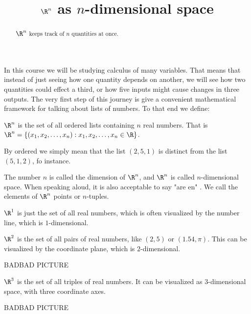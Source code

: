 \documentclass{ximera}
\begin{document}
\title{$\R^n$ as $n$-dimensional space}
\begin{abstract}
	$\R^n$ keeps track of $n$ quantities at once.
\end{abstract}
In this course we will be studying calculus of many variables.  That means that instead of just seeing how one quantity depends on another, we will see
how two quantities could effect a third, or how five inputs might cause changes in three outputs.  The very first step of this journey is give a convenient mathematical 
framework for talking about lists of numbers.  To that end we define:

\begin{definition}
  $\R^n$ is the set of all ordered lists containing $n$ real numbers.  That is $\R^n = \{ (x_1,x_2,\dots, x_n) : x_1,x_2,\dots, x_n \in \R \}$.
\end{definition}

By ordered we simply mean that the list $(2,5,1)$ is distinct from the list $(5,1,2)$, fo instance.

The number $n$ is called the dimension of $\R^n$, and $\R^n$ is called $n$-dimensional space.  When speaking aloud, it is also acceptable to say "are en" .
 We call the elements of $\R^n$ points or $n$-tuples.

\begin{example}
	$\R^1$ is just the set of all real numbers, which is often visualized by the number line, which is $1$-dimensional.
\end{example}



\begin{example}
	$\R^2$ is the set of all pairs of real numbers, like $(2,5)$ or $(1.54,\pi)$. This can be visualized by the coordinate plane, which is $2$-dimensional.
	
	BADBAD PICTURE
	
\end{example}


\begin{example}
	$\R^3$ is the set of all triples of real numbers.  It can be visualized as $3$-dimensional space, with three coordinate axes. 
	
	BADBAD PICTURE
\end{example}
\end{document}
